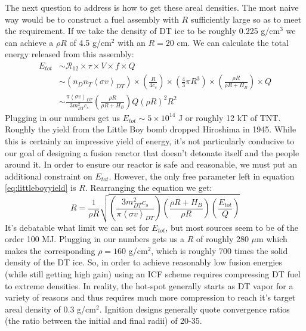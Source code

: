 	The next question to address is how to get these areal densities. The most naive way would be to construct a fuel assembly with $R$ sufficiently large so as to meet the requirement. If we take the density of DT ice to be roughly 0.225 g/cm$^3$ we can achieve a $\rho R$ of 4.5 g/cm$^2$ with an $R=20$ cm. We can calculate the total energy released from this assembly:
	\begin{equation}
		\begin{split}
			E_{tot} & \sim \mathcal{R}_{12} \times \tau \times V \times f \times Q \\
			& \sim \left(n_Dn_T\left<\sigma v\right>_{DT}\right) \times \left( \frac{R}{4 c_s}\right) \times \left(\frac{4}{3} \pi R^3\right) \times \left(\frac{\rho R}{\rho R + H_B}\right) \times Q \\
			& \sim \frac{\pi \left<\sigma v\right>_{DT}}{3 m_{DT}^2 c_s} \left(\frac{\rho R}{\rho R + H_B}\right)Q \left(\rho R\right)^2 R^2
		\end{split}
		\label{eq:littleboyyield}
	\end{equation} 
	Plugging in our numbers get us $E_{tot} \sim 5 \times 10^{14}$ J or roughly 12 kT of TNT. Roughly the yield from the Little Boy bomb dropped Hiroshima in 1945. While this is certainly an impressive yield of energy, it's not particularly conducive to our goal of designing a fusion reactor that doesn't detonate itself and the people around it. In order to ensure our reactor is safe and reasonable, we must put an additional constraint on $E_{tot}$. However, the only free parameter left in equation \ref{eq:littleboyyield} is $R$. Rearranging the equation we get:
	\begin{equation}
		R = \frac{1}{\rho R} \sqrt{\left(\frac{3 m_{DT}^2 c_s}{\pi \left<\sigma v\right>_{DT}}\right) \left(\frac{\rho R + H_B}{\rho R}\right)\left(\frac{E_{tot}}{Q}\right) }
	\end{equation}
	It's debatable what limit we can set for $E_{tot}$, but most sources seem to be of the order 100 MJ. Plugging in our numbers gets us a $R$ of roughly 280 $\mu$m which makes the corresponding $\rho = 160$ g/cm$^2$, which is roughly 700 times the solid density of the DT ice.  So, in order to achieve reasonably low fusion energies (while still getting high gain) using an ICF scheme requires compressing DT fuel to extreme densities. In reality, the hot-spot generally starts as DT vapor for a variety of reasons and thus requires much more compression to reach it's target areal density of 0.3 g/cm$^2$. Ignition designs generally quote convergence ratios (the ratio between the initial and final radii) of 20-35. 
	
